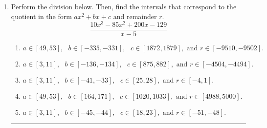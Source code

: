 \documentclass[14pt]{extbook}
\newcommand{\litem}[1]{\item#1\hspace*{-1cm}\rule{\textwidth}{0.4pt}}
\begin{document}
\begin{enumerate}
{\begin{enumerate}[label=\Alph*.]
\end{enumerate} }
\litem{
Perform the division below. Then, find the intervals that correspond to the quotient in the form $ax^2+bx+c$ and remainder $r$.\[ \frac{10x^{3} -85 x^{2} +200 x -129}{x -5} \]\begin{enumerate}[label=\Alph*.]
\item \( a \in [49, 53], \text{   } b \in [-335, -331], \text{   } c \in [1872, 1879], \text{   and   } r \in [-9510, -9502]. \)
\item \( a \in [3, 11], \text{   } b \in [-136, -134], \text{   } c \in [875, 882], \text{   and   } r \in [-4504, -4494]. \)
\item \( a \in [3, 11], \text{   } b \in [-41, -33], \text{   } c \in [25, 28], \text{   and   } r \in [-4, 1]. \)
\item \( a \in [49, 53], \text{   } b \in [164, 171], \text{   } c \in [1020, 1033], \text{   and   } r \in [4988, 5000]. \)
\item \( a \in [3, 11], \text{   } b \in [-45, -44], \text{   } c \in [18, 23], \text{   and   } r \in [-51, -48]. \)

\end{enumerate} }
\end{enumerate}
\end{document}
